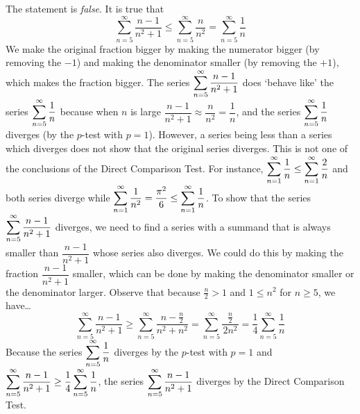 \documentclass[11pt,letterpaper]{article}
\begin{document}
\sol The statement is \textit{false}. It is true that 
	\[
	\sum_{n=5}^\infty \dfrac{n - 1}{n^2 + 1} \leq \sum_{n=5}^\infty \dfrac{n}{n^2}= \sum_{n=5}^\infty \dfrac{1}{n}
	\]
We make the original fraction bigger by making the numerator bigger (by removing the $-1$) and making the denominator smaller (by removing the $+1$), which makes the fraction bigger. The series $\displaystyle\sum_{n=5}^\infty \dfrac{n - 1}{n^2 + 1}$ does `behave like' the series $\displaystyle\sum_{n=5}^\infty \dfrac{1}{n}$ because when $n$ is large $\dfrac{n - 1}{n^2 + 1} \approx \dfrac{n}{n^2}= \dfrac{1}{n}$, and the series $\displaystyle\sum_{n=5}^\infty \dfrac{1}{n}$ diverges (by the $p$-test with $p= 1$). However, a series being less than a series which diverges does not show that the original series diverges. This is not one of the conclusions of the Direct Comparison Test. For instance, $\displaystyle\sum_{n=1}^\infty \dfrac{1}{n} \leq \sum_{n=1}^\infty \dfrac{2}{n}$ and both series diverge while $\displaystyle\sum_{n=1}^\infty \dfrac{1}{n^2}= \dfrac{\pi^2}{6} \leq \sum_{n=1}^\infty \dfrac{1}{n}$. To show that the series $\displaystyle\sum_{n=5}^\infty \dfrac{n - 1}{n^2 + 1}$ diverges, we need to find a series with a summand that is always smaller than $\dfrac{n - 1}{n^2 + 1}$ whose series also diverges. We could do this by making the fraction $\dfrac{n - 1}{n^2 + 1}$ smaller, which can be done by making the denominator smaller or the denominator larger. Observe that because $\frac{n}{2} > 1$ and $1 \leq n^2$ for $n \geq 5$, we have\dots
	\[
	\sum_{n=5}^\infty \dfrac{n - 1}{n^2 + 1} \geq \sum_{n=5}^\infty \dfrac{n - \frac{n}{2}}{n^2 + n^2}= \sum_{n=5}^\infty \dfrac{\;\;\frac{n}{2}\;\;}{2n^2}= \dfrac{1}{4} \sum_{n=5}^\infty \dfrac{1}{n}
	\]
Because the series $\displaystyle\sum_{n=5}^\infty \dfrac{1}{n}$ diverges by the $p$-test with $p= 1$ and $\displaystyle\sum_{n=5}^\infty \dfrac{n - 1}{n^2 + 1} \geq \dfrac{1}{4} \sum_{n=5}^\infty \dfrac{1}{n}$, the series $\displaystyle\sum_{n=5}^\infty \dfrac{n - 1}{n^2 + 1}$ diverges by the Direct Comparison Test. 





\newpage
\end{document}
